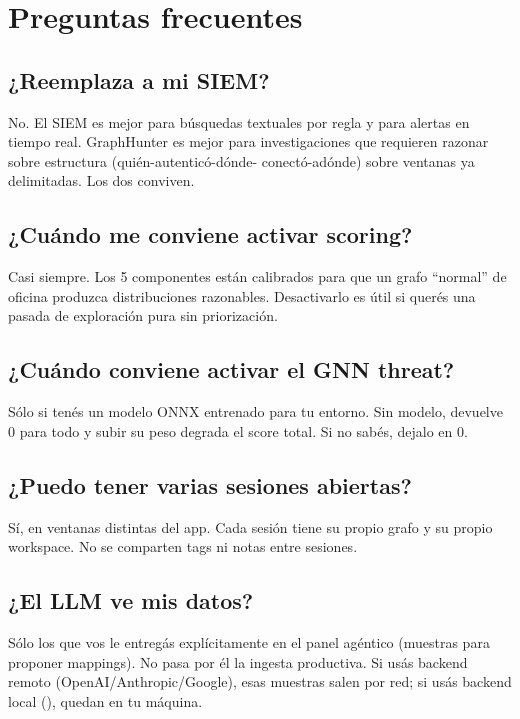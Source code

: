 \chapter{Preguntas frecuentes}
\label{sec:man-faq}

\section{¿Reemplaza a mi SIEM?}

No. El SIEM es mejor para búsquedas textuales por regla y para
alertas en tiempo real. GraphHunter es mejor para investigaciones
que requieren razonar sobre estructura (quién-autenticó-dónde-
conectó-adónde) sobre ventanas ya delimitadas. Los dos conviven.

\section{¿Cuándo me conviene activar scoring?}

Casi siempre. Los 5 componentes están calibrados para que un
grafo ``normal'' de oficina produzca distribuciones razonables.
Desactivarlo es útil si querés una pasada de exploración pura sin
priorización.

\section{¿Cuándo conviene activar el GNN threat?}

Sólo si tenés un modelo ONNX entrenado para tu entorno. Sin
modelo,  devuelve 0 para todo y subir su peso
degrada el score total. Si no sabés, dejalo en 0.

\section{¿Puedo tener varias sesiones abiertas?}

Sí, en ventanas distintas del app. Cada sesión tiene su propio
grafo y su propio workspace. No se comparten tags ni notas entre
sesiones.

\section{¿El LLM ve mis datos?}

Sólo los que vos le entregás explícitamente en el panel agéntico
(muestras para proponer mappings). No pasa por él la ingesta
productiva. Si usás backend remoto (OpenAI/Anthropic/Google), esas
muestras salen por red; si usás backend local
(), quedan en tu máquina.

